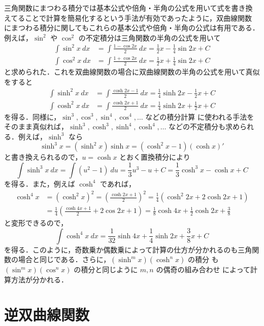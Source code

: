 \documentclass[dvipdfmx,12pt, uplatex]{jsarticle}
\begin{document}
三角関数にまつわる積分では基本公式や倍角・半角の公式を用いて式を書き換
えてることで計算を簡易化するという手法が有効であったように，双曲線関数
にまつわる積分に関してもこれらの基本公式や倍角・半角の公式は有用である．
例えば，$\sin^2$ や $\cos^2$ の不定積分は三角関数の半角の公式を用いて
\begin{align*}
  \int \sin^2 x \ dx &= \int \frac{1-\cos 2x}{2} \ dx 
                       = \frac{1}{2}x -\frac{1}{4} \sin 2x +C\\
  \int \cos^2 x \ dx &= \int \frac{1+\cos 2x}{2} \ dx
                       = \frac{1}{2}x + \frac{1}{4} \sin 2x +C
\end{align*}
と求められた．これを双曲線関数の場合に双曲線関数の半角の公式を用いて真似をすると
\begin{align*}
  \int \sinh^2 x \ dx &= \int \frac{\cosh 2x -1}{2} \ dx
                        = \frac{1}{4} \sinh 2x - \frac{1}{2} x +C\\
  \int \cosh^2 x \ dx &= \int \frac{\cosh 2x +1}{2} \ dx
                        =\frac{1}{4} \sinh 2x + \frac{1}{2} x +C
\end{align*}
を得る．同様に，$\sin^3, \cos^3, \sin^4, \cos^4, \ldots$ などの積分計算
に使われる手法をそのまま真似れば，$\sinh^3, \cosh^3, \sinh^4, \cosh^4,
\ldots$ などの不定積分も求められる．例えば，$\sinh^3$ なら
\[
\sinh^3 x = (\sinh^2 x ) \sinh x = (\cosh^2x-1) (\cosh x)'
\]
と書き換えられるので，$u=\cosh x$ とおく置換積分により
\[
  \int \sinh^3 x \ dx = \int \left( u^2-1 \right) \ du =
  \frac{1}{3}u^3-u +C = \frac{1}{3} \cosh^3 x - \cosh x +C
\]
を得る．また，例えば $\cosh^4$ であれば，
\begin{align*}
  \cosh^4 x &= \left( \cosh^2 x\right)^2 = \left( \frac{\cosh 2x
      +1}{2}\right)^2 = \frac{1}{4}\left( \cosh^2 2x + 2 \cosh 2x
    +1\right)\\
  &= \frac{1}{4} \left( \frac{ \cosh 4x +1}{2} + 2 \cos 2x +1\right)
    = \frac{1}{8} \cosh 4x + \frac{1}{2} \cosh 2x + \frac{3}{8}
\end{align*}
と変形できるので，
\[
  \int \cosh^4 x \ dx = \frac{1}{32} \sinh 4x + \frac{1}{4} \sinh 2x +
  \frac{3}{8}x +C
\]
を得る．このように，奇数乗か偶数乗によって計算の仕方が分かれるのも三角関
数の場合と同じである．さらに，$(\sinh^m x)(\cosh^n x)$ の積分
も $(\sin^m x)(\cos^n x)$ の積分と同じように $m,n$ の偶奇の組み合わせ
によって計算方法が分かれる．


\section{逆双曲線関数}
\end{document}

